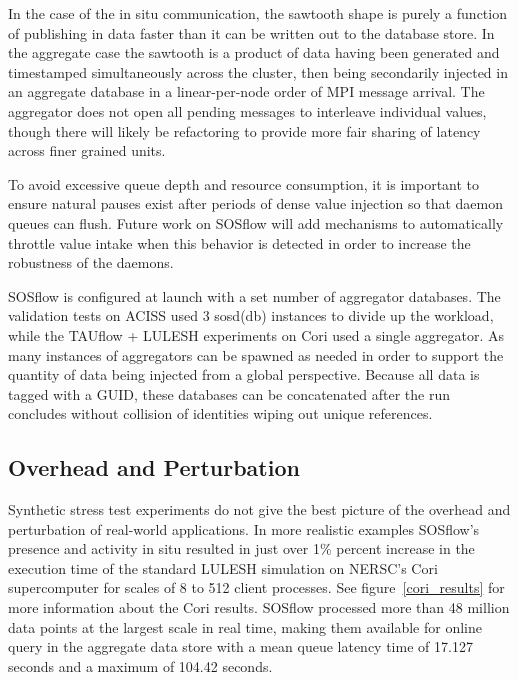 In the case of the in situ communication, the sawtooth shape is purely
a function of publishing in data faster than it can be written out to
the database store.
%
In the aggregate case the sawtooth is a product of data having been
generated and timestamped simultaneously across the cluster, then
being secondarily injected in an aggregate database in a
linear-per-node order of MPI message arrival.
%
The aggregator does not open all pending messages to interleave
individual values, though there will likely be refactoring to provide
more fair sharing of latency across finer grained units.

To avoid excessive queue depth and resource consumption, it is
important to ensure natural pauses exist after periods of dense value
injection so that daemon queues can flush.
%
Future work on SOSflow will add mechanisms to automatically throttle
value intake when this behavior is detected in order to increase the
robustness of the daemons.


SOSflow is configured at launch with a set number of aggregator
databases.
%
The validation tests on ACISS used 3 sosd(db) instances to divide up
the workload, while the TAUflow + LULESH experiments on Cori used a
single aggregator.
%
As many instances of aggregators can be spawned as needed in order to
support the quantity of data being injected from a global
perspective.
%
Because all data is tagged with a GUID, these databases can be
concatenated after the run concludes without collision of identities
wiping out unique references.



\subsection{Overhead and Perturbation}

Synthetic stress test experiments do not give the best picture of the
overhead and perturbation of real-world applications.
%
In more realistic examples SOSflow's presence and activity in situ
resulted in just over 1\% percent increase in the execution time of
the standard LULESH simulation on NERSC's Cori supercomputer for
scales of 8 to 512 client processes.
%
See figure~\ref{cori_results} for more information about the Cori
results.
%
SOSflow processed more than 48 million data points at the largest
scale in real time, making them available for online query in the
aggregate data store with a mean queue latency time of 17.127 seconds
and a maximum of 104.42 seconds.

